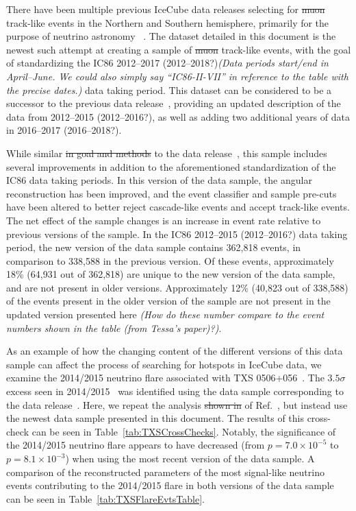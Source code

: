 \documentclass[aps,10pt,prd,twocolumn,floats,letterpaper,showpacs,nofootinbib,bibnotes,notitlepage,superscriptaddress,floatfix]{revtex4-1}
\newcommand{\MA}[1]{{\color{magenta}#1}}
\begin{document}
There have been multiple previous IceCube data releases selecting for \MA{\sout{muon}} track-like events in the \MA{Northern and Southern} hemisphere, primarily for the purpose of neutrino astronomy ~\cite{Abbasi:2010rd,Aartsen:2013uuv,IceCube:2018,IceCube:2019,IceCube:TXS2018}. The dataset detailed in this document is the newest such attempt at creating a sample of \MA{\sout{muon}} track-like events, with the goal of standardizing the IC86 2012--2017 \MA{(2012--2018?)}\MA{\it (Data periods start/end in April--June. We could also simply say ``IC86-II-VII'' in reference to the table with the precise dates.)} data taking period. This dataset can be considered to be a successor to \MA{the previous data release}~\cite{IceCube:2019}, providing an updated description of the data from 2012--2015 \MA{(2012--2016?)}, as well as adding two additional years of data in 2016--2017 \MA{(2016--2018?)}. 

While similar \MA{\sout{in goal and methods} to the data release}~\cite{IceCube:2019}, this sample includes several improvements in addition to the aforementioned standardization of the IC86 data taking periods. In this version of the data sample, the angular reconstruction has been improved, and the event classifier and sample pre-cuts have been altered to better reject cascade-like events and accept track-like events. The net effect of the sample changes is an increase in event rate relative to previous versions of the sample. In the IC86 2012--2015 \MA{(2012--2016?)} data taking period, the new version of the data sample contains 362,818 events, in comparison to 338,588 in the previous version. Of these events, approximately 18\% (64,931 out of 362,818) are unique to the new version of the data sample, and are not present in older versions. Approximately 12\% (40,823 out of 338,588) of the events present in the older version of the sample are not present in the updated version presented here \MA{\it (How do these number compare to the event numbers shown in the table (from Tessa's paper)?)}. 

As an example of how the changing content of the different versions of this data sample can affect the process of searching for hotspots in IceCube data, we examine the 2014/2015 neutrino flare associated with TXS 0506+056~\cite{IceCube:2018cha}. The $3.5 \sigma$ excess seen in 2014/2015~\cite{IceCube:2018cha} was identified using the data sample corresponding to \MA{the data release}~\cite{IceCube:2019}. Here, we repeat the analysis \MA{\sout{shown in} of Ref.}~\cite{IceCube:2018cha}, but instead use the newest data sample presented in this document. The results of this cross-check can be seen in Table~\ref{tab:TXSCrossChecks}. Notably, the significance of the 2014/2015 neutrino flare appears to have decreased (from $p=7.0 \times 10^{-5}$ to $p=8.1 \times 10^{-3}$) when using the most recent version of the data sample. A comparison of the reconstructed parameters of the most signal-like neutrino events contributing to the 2014/2015 flare in both versions of the data sample can be seen in Table~\ref{tab:TXSFlareEvtsTable}.
\end{document}
